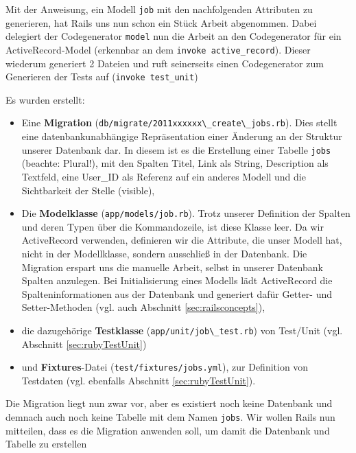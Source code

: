 Mit der Anweisung, ein Modell \texttt{job} mit den nachfolgenden Attributen zu generieren, hat Rails uns nun schon ein Stück Arbeit abgenommen. Dabei delegiert der Codegenerator \texttt{model} nun die Arbeit an den Codegenerator für ein ActiveRecord-Model (erkennbar an dem \texttt{invoke active\_record}). Dieser wiederum generiert 2 Dateien und ruft seinerseits einen Codegenerator zum Generieren der Tests auf (\texttt{invoke test\_unit})

Es wurden erstellt:
\begin{itemize}
 \item Eine \textbf{Migration} (\verb|db/migrate/2011xxxxxx\_create\_jobs.rb|). Dies stellt eine datenbankunabhängige Repräsentation einer Änderung an der Struktur unserer Datenbank dar. In diesem ist es die Erstellung einer Tabelle \texttt{jobs} (beachte: Plural!), mit den Spalten Titel, Link als String, Description als Textfeld, eine User\_ID als Referenz auf ein anderes Modell und die Sichtbarkeit der Stelle (visible),
 \item Die \textbf{Modelklasse} (\verb|app/models/job.rb|). Trotz unserer Definition der Spalten und deren Typen über die Kommandozeile, ist diese Klasse leer. Da wir ActiveRecord verwenden, definieren wir die Attribute, die unser Modell hat, nicht in der Modellklasse, sondern ausschließ in der Datenbank. Die Migration erspart uns die manuelle Arbeit, selbst in unserer Datenbank Spalten anzulegen. Bei Initialisierung eines Modells lädt ActiveRecord die Spalteninformationen aus der Datenbank und generiert dafür Getter- und Setter-Methoden (vgl. auch Abschnitt \ref{sec:railsconcepts}),
 \item die dazugehörige \textbf{Testklasse} (\verb|app/unit/job\_test.rb|) von Test/Unit (vgl. Abschnitt \ref{sec:rubyTestUnit})
 \item und \textbf{Fixtures}-Datei (\verb|test/fixtures/jobs.yml|), zur Definition von Testdaten (vgl. ebenfalls Abschnitt \ref{sec:rubyTestUnit}).
\end{itemize}

Die Migration liegt nun zwar vor, aber es existiert noch keine Datenbank und demnach auch noch keine Tabelle mit dem Namen \texttt{jobs}.
Wir wollen Rails nun mitteilen, dass es die Migration anwenden soll, um damit die Datenbank und Tabelle zu erstellen


